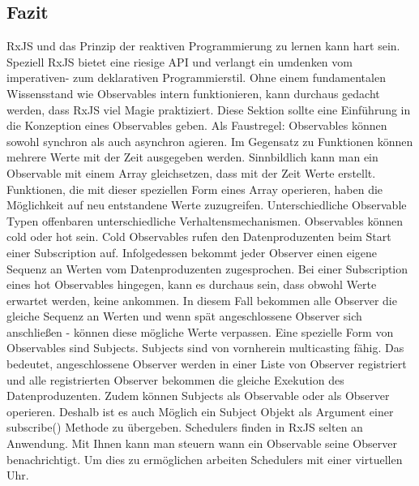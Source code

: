\subsection{Fazit}
RxJS und das Prinzip der reaktiven Programmierung zu lernen kann hart sein. Speziell RxJS bietet eine riesige API und verlangt ein umdenken vom imperativen- zum deklarativen Programmierstil. Ohne einem fundamentalen Wissensstand wie Observables intern funktionieren, kann durchaus gedacht werden, dass RxJS viel \glqq Magie\grqq{} praktiziert. Diese Sektion sollte eine Einführung in die Konzeption eines Observables geben. Als Faustregel: Observables können sowohl synchron als auch asynchron agieren. Im Gegensatz zu Funktionen können mehrere Werte mit der Zeit ausgegeben werden. Sinnbildlich kann man ein Observable mit einem Array gleichsetzen, dass mit der Zeit Werte erstellt. Funktionen, die mit dieser speziellen Form eines Array operieren, haben die Möglichkeit auf neu entstandene Werte zuzugreifen. Unterschiedliche Observable Typen offenbaren unterschiedliche Verhaltensmechanismen. Observables können cold oder hot sein. Cold Observables rufen den Datenproduzenten beim Start einer Subscription auf. Infolgedessen bekommt jeder Observer einen eigene Sequenz an Werten vom Datenproduzenten zugesprochen. Bei einer Subscription eines hot Observables hingegen, kann es durchaus sein, dass obwohl Werte erwartet werden, keine ankommen. In diesem Fall bekommen alle Observer die gleiche Sequenz an Werten und wenn spät angeschlossene Observer sich anschließen - können diese mögliche Werte verpassen. Eine spezielle Form von Observables sind Subjects. Subjects sind von vornherein multicasting fähig. Das bedeutet, angeschlossene Observer werden in einer Liste von Observer registriert und alle registrierten Observer bekommen die gleiche Exekution des Datenproduzenten. Zudem können Subjects als Observable oder als Observer operieren. Deshalb ist es auch Möglich ein Subject Objekt als Argument einer subscribe() Methode zu übergeben. Schedulers finden in RxJS selten an Anwendung. Mit Ihnen kann man steuern wann ein Observable seine Observer benachrichtigt. Um dies zu ermöglichen arbeiten Schedulers mit einer virtuellen Uhr.

